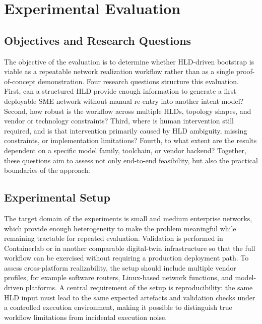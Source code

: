\documentclass[conference]{IEEEtran}
\begin{document}
\section{Experimental Evaluation}


\subsection{Objectives and Research Questions}

The objective of the evaluation is to determine whether HLD-driven bootstrap is viable as a repeatable network realization workflow rather than as a single proof-of-concept demonstration. Four research questions structure this evaluation. First, can a structured HLD provide enough information to generate a first deployable SME network without manual re-entry into another intent model? Second, how robust is the workflow across multiple HLDs, topology shapes, and vendor or technology constraints? Third, where is human intervention still required, and is that intervention primarily caused by HLD ambiguity, missing constraints, or implementation limitations? Fourth, to what extent are the results dependent on a specific model family, toolchain, or vendor backend? Together, these questions aim to assess not only end-to-end feasibility, but also the practical boundaries of the approach.

\subsection{Experimental Setup}

The target domain of the experiments is small and medium enterprise networks, which provide enough heterogeneity to make the problem meaningful while remaining tractable for repeated evaluation. Validation is performed in Containerlab or in another comparable digital-twin infrastructure so that the full workflow can be exercised without requiring a production deployment path. To assess cross-platform realizability, the setup should include multiple vendor profiles, for example software routers, Linux-based network functions, and model-driven platforms. A central requirement of the setup is reproducibility: the same HLD input must lead to the same expected artefacts and validation checks under a controlled execution environment, making it possible to distinguish true workflow limitations from incidental execution noise.
\end{document}
